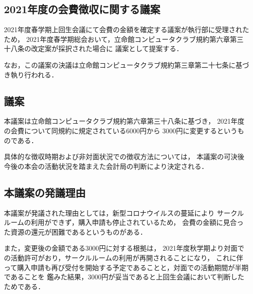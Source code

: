 \subsection*{2021年度の会費徴収に関する議案}

2021年度春学期上回生会議にて会費の金額を確定する議案が執行部に受理されたため，
2021年度春学期総会おいて，立命館コンピュータクラブ規約第六章第三十八条の改定案が採択された場合に
議案として提案する．

なお，この議案の決議は立命館コンピュータクラブ規約第三章第二十七条に基づき執り行われる．


\subsection*{議案}
本議案は立命館コンピュータクラブ規約第六章第三十八条に基づき，
2021年度の会費について同規約に規定されている6000円から
3000円に変更するというものである．

具体的な徴収時期および非対面状況での徴収方法については，
本議案の可決後今後の本会の活動状況を踏まえた会計局の判断により決定される．


\subsection*{本議案の発議理由}
本議案が発議された理由としては，新型コロナウイルスの蔓延により
サークルルームの利用ができず，購入申請も停止されているため，
会費の金額に見合った資源の還元が困難であるというものがある．

また，変更後の金額である3000円に対する根拠は，
2021年度秋学期より対面での活動許可がおり，サークルルームの利用が再開されることになり，
これに伴って購入申請も再び受付を開始する予定であることと，対面での活動期間が半期であることを
鑑みた結果，3000円が妥当であると上回生会議において判断したためである．
